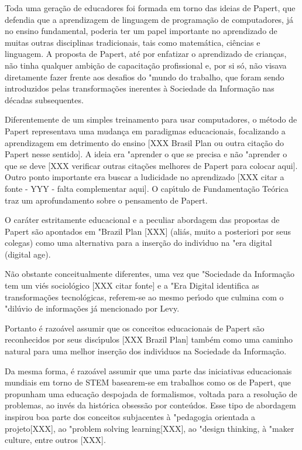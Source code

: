 \documentclass[
12pt,		%
openright,	%
twoside,  %
a4paper,			%
chapter=TITLE,		%
english,			%
french,				%
spanish,			%
brazil				%
]{USPSC-classe/USPSC}
\begin{document}
Toda uma gera\c{c}\~ao de educadores foi formada em torno das ideias de Papert, que defendia que a aprendizagem de linguagem de programa\c{c}\~ao de computadores, j\'a no ensino fundamental, poderia ter um papel importante no aprendizado de muitas outras disciplinas tradicionais, tais como matem\'atica, ci\^encias e linguagem. A proposta de Papert, at\'e por enfatizar o aprendizado de crian\c{c}as, n\~ao tinha qualquer ambi\c{c}\~ao de capacita\c{c}\~ao profissional e, por si s\'o, n\~ao visava diretamente fazer frente aos desafios do "mundo do trabalho, que foram sendo introduzidos pelas transforma\c{c}\~oes inerentes \`a Sociedade da Informa\c{c}\~ao nas d\'ecadas subsequentes. 




Diferentemente de um simples treinamento para usar computadores, o m\'etodo de Papert representava uma mudan\c{c}a em paradigmas educacionais, focalizando a aprendizagem em detrimento do ensino [XXX Brasil Plan ou outra cita\c{c}\~ao do Papert nesse sentido]. A ideia era "aprender o que se precisa e n\~ao "aprender o que se deve [XXX verificar outras cita\c{c}\~oes melhores de Papert para colocar aqui]. Outro ponto importante era buscar a ludicidade no aprendizado [XXX citar a fonte - YYY - falta complementar aqui]. O cap\'{\i}tulo de Fundamenta\c{c}\~ao Te\'orica traz um aprofundamento sobre o pensamento de Papert.




O car\'ater estritamente educacional e a peculiar abordagem das propostas de Papert s\~ao apontados em "Brazil Plan [XXX] (ali\'as, muito a posteriori por seus colegas) como uma alternativa para a inser\c{c}\~ao do indiv\'{\i}duo na "era digital (digital age). 




N\~ao obstante conceitualmente diferentes, uma vez que "Sociedade da Informa\c{c}\~ao tem um vi\'es sociol\'ogico [XXX citar fonte] e a "Era Digital identifica as transforma\c{c}\~oes tecnol\'ogicas, referem-se ao mesmo per\'{\i}odo que culmina com o "dil\'uvio de informa\c{c}\~oes j\'a mencionado por Levy. 




Portanto \'e razo\'avel assumir que os conceitos educacionais de Papert s\~ao reconhecidos por seus disc\'{\i}pulos [XXX Brazil Plan] tamb\'em como uma caminho natural para uma melhor inser\c{c}\~ao dos indiv\'{\i}duos na Sociedade da Informa\c{c}\~ao.




Da mesma forma, \'e razo\'avel assumir que uma parte das iniciativas educacionais mundiais em torno de STEM basearem-se em trabalhos como os de Papert, que propunham uma educa\c{c}\~ao despojada de formalismos, voltada para a resolu\c{c}\~ao de problemas, ao inv\'es da hist\'orica obsess\~ao por conte\'udos. Esse tipo de abordagem inspirou boa parte dos conceitos subjacentes \`a "pedagogia orientada a projeto[XXX], ao "problem solving learning[XXX], ao "design thinking, \`a "maker culture, entre outros [XXX].
\end{document}
